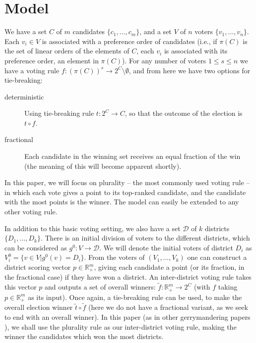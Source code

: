 \documentclass[letterpaper]{article} %
\begin{document}
\section{Model}

We have a set $C$ of $m$ candidates $\{c_{1},\ldots,c_{m}\}$, and a set $V$ of $n$ voters $\{v_{1},\ldots,v_{n}\}$. Each $v_{i}\in V$ is associated with a preference order of candidates (i.e., if $\pi(C)$ is the set of linear orders of the elements of $C$, each $v_{i}$ is associated with its preference order, an element in $\pi(C)$). For any number of voters $1\leq s\leq n$ we have a voting rule $f:(\pi(C))^{s}\rightarrow 2^{C} \setminus \emptyset$, and from here we have two options for tie-breaking:
\begin{description}
	\item[deterministic] Using tie-breaking rule $t:2^{C}\rightarrow C$, so that the outcome of the election is $t\circ f$.
	\item [fractional] Each candidate in the winning set receives an equal fraction of the win (the meaning of this will become apparent shortly).
\end{description}

In this paper, we will focus on plurality -- the most commonly used voting rule -- in which each vote gives a point to its top-ranked candidate, and the candidate with the most points is the winner. The model can easily be extended to any other voting rule.

In addition to this basic voting setting, we also have a set $\mathcal{D}$ of $k$ districts $\{D_{1},\ldots,D_{k}\}$. There is an initial division of voters to the different districts, which can be considered as $g^{0}:V\rightarrow \mathcal{D}$. We will denote the initial voters of district $D_{i}$ as $V^{0}_{i}=\{v\in V | g^{0}(v)=D_{i}\}$. From the voters of $(V_{1},\ldots, V_{k})$ one can construct a district scoring vector $p\in\mathbb{R}_{+}^{m}$, giving each candidate a point (or its fraction, in the fractional case) if they have won a district. An inter-district voting rule takes this vector $p$ and outputs a set of overall winners: $\tilde{f}:\mathbb{R}_{+}^{m}\rightarrow 2^{C}$ (with $f$ taking $p\in\mathbb{R}_{+}^{m}$ as its input). Once again, a tie-breaking rule can be used, to make the overall election winner $\tilde{t}\circ \tilde{f}$ (here we do not have a fractional variant, as we seek to end with an overall winner). In this paper (as in other gerrymandering papers \cite{BLLZ16,LLR17,BLSS18}), we shall use the plurality rule as our inter-district voting rule, making the winner the candidates which won the most districts.
\end{document}
